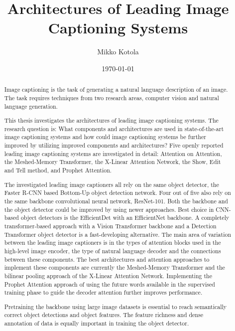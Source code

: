 \documentclass[english,twoside,openright]{HYgraduMLDS}
\title{Architectures of Leading Image Captioning Systems}
\author{Mikko Kotola}
\date{\today}
\begin{document}
\maketitle


\begin{abstract} 
Image captioning is the task of generating a natural language description of an image. The task requires techniques from two research areas, computer vision and natural language generation.

This thesis investigates the architectures of leading image captioning systems. The research question is: What components and architectures are used in state-of-the-art image captioning systems and how could image captioning systems be further improved by utilizing improved components and architectures? Five openly reported leading image captioning systems are investigated in detail: Attention on Attention, the Meshed-Memory Transformer, the X-Linear Attention Network, the Show, Edit and Tell method, and Prophet Attention.

The investigated leading image captioners all rely on the same object detector, the Faster R-CNN based Bottom-Up object detection network. Four out of five also rely on the same backbone convolutional neural network, ResNet-101. Both the backbone and the object detector could be improved by using newer approaches. Best choice in CNN-based object detectors is the EfficientDet with an EfficientNet backbone. A completely transformer-based approach with a Vision Transformer backbone and a Detection Transformer object detector is a fast-developing alternative. The main area of variation between the leading image captioners is in the types of attention blocks used in the high-level image encoder, the type of natural language decoder and the connections between these components. The best architectures and attention approaches to implement these components are currently the Meshed-Memory Transformer and the bilinear pooling approach of the X-Linear Attention Network. Implementing the Prophet Attention approach of using the future words available in the supervised training phase to guide the decoder attention further improves performance.

Pretraining the backbone using large image datasets is essential to reach semantically correct object detections and object features. The feature richness and dense annotation of data is equally important in training the object detector.
\end{abstract}
\end{document}
